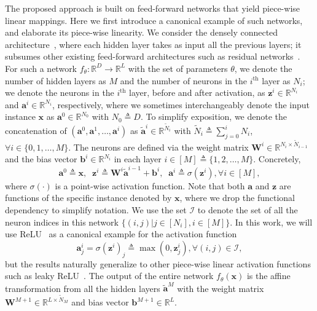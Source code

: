 \documentclass{article} \usepackage{iclr2020_conference,times}
\def\va{{\bm{a}}}
\def\vb{{\bm{b}}}
\def\vx{{\bm{x}}}
\def\vz{{\bm{z}}}
\def\mW{{\bm{W}}}
\def\gI{{\mathcal{I}}}
\def\sR{{\mathbb{R}}}
\begin{document}
The proposed approach is built on feed-forward networks that yield piece-wise linear mappings. Here we first introduce a canonical example of such networks, and elaborate its piece-wise linearity. We consider the densely connected architecture~\citep{huang2017densely}, where each hidden layer takes as input all the previous layers; it subsumes other existing feed-forward architectures such as residual networks~\citep{he2016deep}. For such a network $f_\theta: \sR^D \to \sR^L$ with the set of parameters $\theta$, we denote the number of hidden layers as $M$ and the number of neurons in the $i^\text{th}$ layer as $N_i$; we denote the neurons in the $i^\text{th}$ layer, before and after activation, as $\vz^i \in \sR^{N_i}$ and $\va^i \in \sR^{N_i}$, respectively, where we sometimes interchangeably denote the input instance $\vx$ as $\va^0 \in \sR^{N_0}$ with $N_0 \triangleq D$. To simplify exposition, we denote the concatenation of $(\va^0, \va^1, \dots, \va^i)$ as $\tilde \va^i \in \sR^{\tilde N_i}$ with $\tilde N_i \triangleq \sum_{j=0}^i N_i$, $\forall i \in \{0, 1, \dots, M\}$. The neurons are defined via the weight matrix $\mW^i \in \sR^{N_i \times \tilde N_{i-1}}$ and the bias vector $\vb^i \in \sR^{N_i}$ in each layer $i \in [M] \triangleq \{1, 2, \dots, M\}$. Concretely,
\begin{equation}
\va^0 \triangleq \vx, \;\;\vz^i \triangleq \mW^i \tilde \va^{i-1} + \vb^i, \;\; \va^i \triangleq \sigma(\vz^i), \forall i \in [M], \label{eq:forward}
\end{equation}
where $\sigma(\cdot)$ is a point-wise activation function. Note that both $\va$ and $\vz$ are functions of the specific instance denoted by $\vx$, where we drop the functional dependency to simplify notation. We use the set $\gI$ to denote the set of all the neuron indices in this network $\{(i, j) | j \in [N_i], i \in [M]\}$. In this work, we will use ReLU~\citep{nair2010rectified} as a canonical example for the activation function
\begin{equation}
\va^i_j = \sigma(\vz^i)_j \triangleq \max(0, \vz^i_j), \forall (i, j) \in \gI, \label{eq:activation}
\end{equation}
but the results naturally generalize to other piece-wise linear activation functions such as leaky ReLU~\citep{maas2013rectifier}. The output of the entire network $f_\theta(\vx)$ is the affine transformation from all the hidden layers $\tilde \va^M$ with the weight matrix $\mW^{M+1} \in \sR^{L \times \tilde N_{M}}$ and bias vector $\vb^{M+1} \in \sR^{L}$. 
 \vspace{-1mm}
\end{document}
